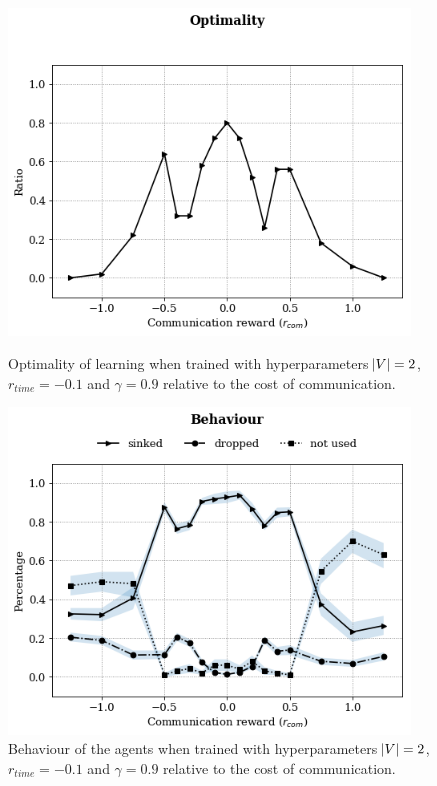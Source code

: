 \begin{figure}[H]
\centering
\begin{minipage}[t]{.5\textwidth}
    \centering
    \includegraphics[width=0.95\textwidth]{imgs/exp-2-rwdc-2msg-optimality.png}
    \caption[Influence of $r_{com}$ on optimality of learning]{Optimality of learning when trained with hyperparameters $\abs{V}=2$, $r_{time}=-0.1$ and $\gamma=0.9$ relative to the cost of communication.}
    \label{fig:exp-2-rwdc-optimal}
\end{minipage}%
\begin{minipage}[t]{.50\textwidth}
    \centering
    \includegraphics[width=0.95\textwidth]{imgs/exp-2-rwdc-2msg-behaviour.png}
    \caption[Influence of $r_{com}$ on the behaviour of the agents]{Behaviour of the agents when trained with hyperparameters $\abs{V}=2$, $r_{time}=-0.1$ and $\gamma=0.9$ relative to the cost of communication.}
    \label{fig:exp-2-rwdc-behaviour}
\end{minipage}
\end{figure}


